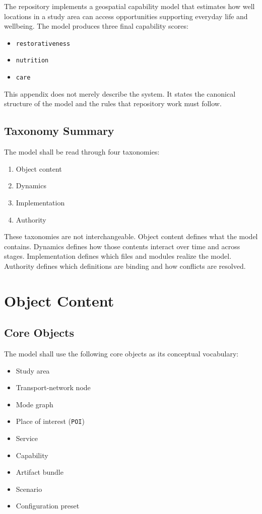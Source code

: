 \documentclass[11pt]{article}
\begin{document}
The repository implements a geospatial capability model that estimates how well locations in a study area can access opportunities supporting everyday life and wellbeing. The model produces three final capability scores:

\begin{itemize}
  \item \texttt{restorativeness}
  \item \texttt{nutrition}
  \item \texttt{care}
\end{itemize}

This appendix does not merely describe the system. It states the canonical structure of the model and the rules that repository work must follow.

\subsection*{Taxonomy Summary}

The model shall be read through four taxonomies:

\begin{enumerate}
  \item Object content
  \item Dynamics
  \item Implementation
  \item Authority
\end{enumerate}

These taxonomies are not interchangeable. Object content defines what the model contains. Dynamics defines how those contents interact over time and across stages. Implementation defines which files and modules realize the model. Authority defines which definitions are binding and how conflicts are resolved.

\section{Object Content}

\subsection*{Core Objects}

The model shall use the following core objects as its conceptual vocabulary:

\begin{itemize}
  \item Study area
  \item Transport-network node
  \item Mode graph
  \item Place of interest (\texttt{POI})
  \item Service
  \item Capability
  \item Artifact bundle
  \item Scenario
  \item Configuration preset
\end{itemize}
\end{document}
